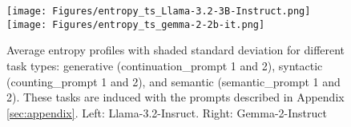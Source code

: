 
\begin{figure}[ht]
    \centering
    \texttt{[image: Figures/entropy\_ts\_Llama-3.2-3B-Instruct.png]}
    \texttt{[image: Figures/entropy\_ts\_gemma-2-2b-it.png]}
    \caption{Average entropy profiles with shaded standard deviation for different task types: generative (continuation\_prompt 1 and 2), syntactic (counting\_prompt 1 and 2), and semantic (semantic\_prompt 1 and 2). These tasks are induced with the prompts described in Appendix \ref{sec:appendix}.  Left: Llama-3.2-Insruct. Right: Gemma-2-Instruct}
    \label{fig:tiny_ent}
\end{figure}



